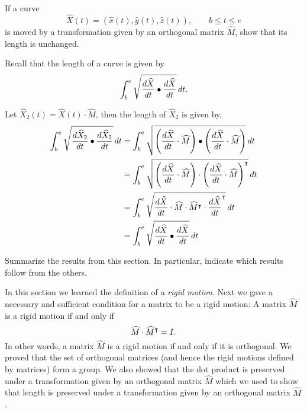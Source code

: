 \documentclass{ximera}
\begin{document}
\begin{problem}
If a curve
\[
\hat{X}(t) = \left(\hat{x}(t),\hat{y}(t),\hat{z}(t)\right),\qquad b\le t\le e
\]
is moved by a transformation given by an orthogonal matrix $\hat{M}$,
show that its length is unchanged.
\begin{hint}
  Recall that the length of a curve is given by
\[
\int_{b}^{e} \sqrt{\frac{d\widehat{X}}{dt} \bullet \frac{d\widehat{X}}{dt}}\,d t.
\]  
\end{hint}

\begin{freeResponse}
Let $\hat{X}_{2}(t) = \hat{X}(t) \cdot \hat{M}$, then the length of $\hat{X}_{2}$ is given by,
\begin{align*}
\int_{b}^{e} \sqrt{\frac{d\widehat{X}_{2}}{dt} \bullet \frac{d\widehat{X}_{2}}{dt}}\,d t 
	&= \int_{b}^{e} \sqrt{ \left( \frac{d\widehat{X}}{dt} \cdot \widehat{M} \right) \bullet 
	\left( \frac{d\widehat{X}}{dt} \cdot \widehat{M} \right)}\,d t \\
	&= \int_{b}^{e} \sqrt{ \left( \frac{d\widehat{X}}{dt} \cdot \widehat{M} \right) \cdot 
	\left( \frac{d\widehat{X}}{dt} \cdot \widehat{M} \right)^\intercal}\,d t \\
	&= \int_{b}^{e} \sqrt{ \frac{d\widehat{X}}{dt} \cdot \widehat{M} \cdot 
	 \widehat{M}^\intercal \cdot \frac{d\widehat{X}}{dt}^\intercal}\,d t \\
	 &= \int_{b}^{e} \sqrt{ \frac{d\widehat{X}}{dt} \bullet \frac{d\widehat{X}}{dt}}\,d t
\end{align*}
\end{freeResponse}
\end{problem}


\begin{problem}
Summarize the results from this section. In particular, indicate which
results follow from the others.
\begin{freeResponse}
In this section we learned the definition of a \textit{rigid motion}. Next we gave a necessary and sufficient condition for a matrix to be a rigid motion: 
A matrix $\hat{M}$ is a rigid motion if and only if 
\[
\widehat{M}\cdot\widehat{M}^\intercal = I.
\]
In other words, a matrix $\hat{M}$ is a rigid motion if and only if it is orthogonal.
We proved that the set of orthogonal matrices (and hence the rigid motions defined by matrices) form a group. 
We also showed that the dot product is preserved under a transformation given by an orthogonal matrix $\hat{M}$ which we used to show that length is preserved under a transformation given by an orthogonal matrix $\hat{M}$.
\end{freeResponse}
\end{problem}
\end{document}
